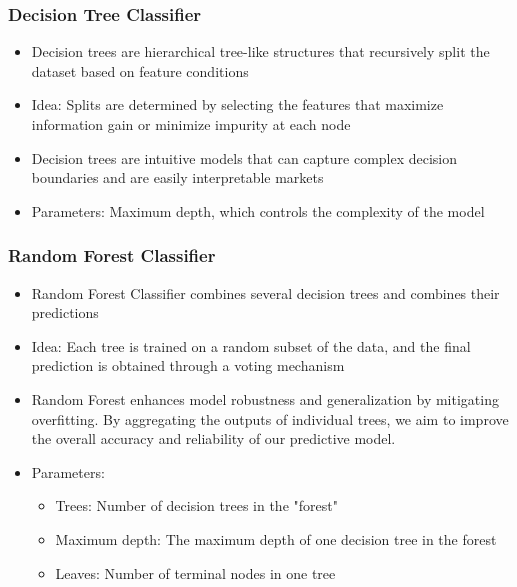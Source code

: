 \documentclass{beamer}
\begin{document}
\begin{frame}
\frametitle{Decision Tree Classifier}
\begin{itemize}
\item Decision trees are hierarchical tree-like structures that recursively split the dataset based on feature conditions
\item Idea: Splits are determined by selecting the features that maximize information gain or minimize impurity at each node
\item Decision trees are intuitive models that can capture complex decision boundaries and are easily interpretable markets
\item Parameters: Maximum depth, which controls the complexity of the model 
\end{itemize}
\end{frame}

\begin{frame}
\frametitle{Random Forest Classifier}
\begin{itemize}
\item Random Forest Classifier combines several decision trees and combines their predictions
\item Idea:  Each tree is trained on a random subset of the data, and the final prediction is obtained through a voting mechanism
\item  Random Forest enhances model robustness and generalization by mitigating overfitting. By aggregating the outputs of individual trees, we aim to improve the overall accuracy and reliability of our predictive model.
\item Parameters: 
    \begin{itemize}
    \item Trees: Number of decision trees in the "forest" 
    \item Maximum depth: The maximum depth of one decision tree in the forest
    \item Leaves: Number of terminal nodes in one tree
    \end{itemize}
\end{itemize}
\end{frame}
\end{document}
